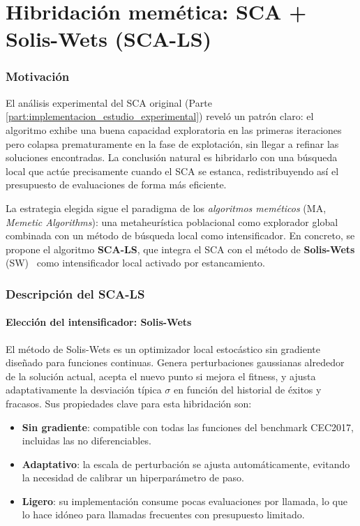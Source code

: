 \documentclass[12pt,a4paper]{article}
\begin{document}
\part{Hibridación memética: SCA + Solis-Wets (SCA-LS)}\label{part:hibridacion_memetica}

\section{Motivación}

El análisis experimental del SCA original (Parte \ref{part:implementacion_estudio_experimental}) reveló un patrón claro: el algoritmo exhibe una buena capacidad exploratoria en las primeras iteraciones pero colapsa prematuramente en la fase de explotación, sin llegar a refinar las soluciones encontradas. La conclusión natural es hibridarlo con una búsqueda local que actúe precisamente cuando el SCA se estanca, redistribuyendo así el presupuesto de evaluaciones de forma más eficiente.

La estrategia elegida sigue el paradigma de los \textit{algoritmos meméticos} (MA, \textit{Memetic Algorithms}): una metaheurística poblacional como explorador global combinada con un método de búsqueda local como intensificador. En concreto, se propone el algoritmo \textbf{SCA-LS}, que integra el SCA con el método de \textbf{Solis-Wets} (SW)~\cite{solis1981} como intensificador local activado por estancamiento.

\section{Descripción del SCA-LS}

\subsection{Elección del intensificador: Solis-Wets}

El método de Solis-Wets es un optimizador local estocástico sin gradiente diseñado para funciones continuas. Genera perturbaciones gaussianas alrededor de la solución actual, acepta el nuevo punto si mejora el fitness, y ajusta adaptativamente la desviación típica $\sigma$ en función del historial de éxitos y fracasos. Sus propiedades clave para esta hibridación son:

\begin{itemize}
  \item \textbf{Sin gradiente}: compatible con todas las funciones del benchmark CEC2017, incluidas las no diferenciables.
  \item \textbf{Adaptativo}: la escala de perturbación se ajusta automáticamente, evitando la necesidad de calibrar un hiperparámetro de paso.
  \item \textbf{Ligero}: su implementación consume pocas evaluaciones por llamada, lo que lo hace idóneo para llamadas frecuentes con presupuesto limitado.
\end{itemize}
\end{document}
